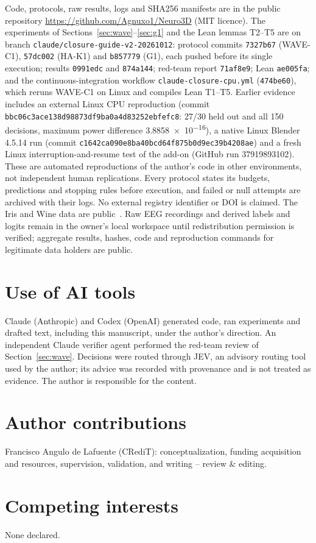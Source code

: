 \documentclass[11pt,a4paper]{article}
\begin{document}
Code, protocols, raw results, logs and SHA256 manifests are in the public repository \url{https://github.com/Agnuxo1/Neuro3D} (MIT licence). The experiments of Sections~\ref{sec:wave}--\ref{sec:g1} and the Lean lemmas T2--T5 are on branch \texttt{claude/closure-guide-v2-20261012}: protocol commits \texttt{7327b67} (WAVE-C1), \texttt{57dc002} (HA-K1) and \texttt{b857779} (G1), each pushed before its single execution; results \texttt{0991edc} and \texttt{874a144}; red-team report \texttt{71af8e9}; Lean \texttt{ae005fa}; and the continuous-integration workflow \texttt{claude-closure-cpu.yml} (\texttt{474be60}), which reruns WAVE-C1 on Linux and compiles Lean T1--T5. Earlier evidence includes an external Linux CPU reproduction (commit \texttt{bbc06c3ace138d98873df9ba0a4d83252ebfefc8}: 27/30 held out and all 150 decisions, maximum power difference \num{3.8858e-16}), a native Linux Blender 4.5.14 run (commit \texttt{c1642ca090e8ba40bcd64f875b0d9ec39b4208ae}) and a fresh Linux interruption-and-resume test of the add-on (GitHub run 37919893102). These are automated reproductions of the author's code in other environments, not independent human replications. Every protocol states its budgets, predictions and stopping rules before execution, and failed or null attempts are archived with their logs. No external registry identifier or DOI is claimed. The Iris and Wine data are public~\cite{uciiris,uciwine}. Raw EEG recordings and derived labels and logits remain in the owner's local workspace until redistribution permission is verified; aggregate results, hashes, code and reproduction commands for legitimate data holders are public.

\section*{Use of AI tools}
Claude (Anthropic) and Codex (OpenAI) generated code, ran experiments and drafted text, including this manuscript, under the author's direction. An independent Claude verifier agent performed the red-team review of Section~\ref{sec:wave}. Decisions were routed through JEV, an advisory routing tool used by the author; its advice was recorded with provenance and is not treated as evidence. The author is responsible for the content.

\section*{Author contributions}
Francisco Angulo de Lafuente (CRediT): conceptualization, funding acquisition and resources, supervision, validation, and writing -- review \& editing.

\section*{Competing interests}
None declared.

\footnotesize
\setlength{\bibsep}{2pt plus 1pt}


\end{document}

